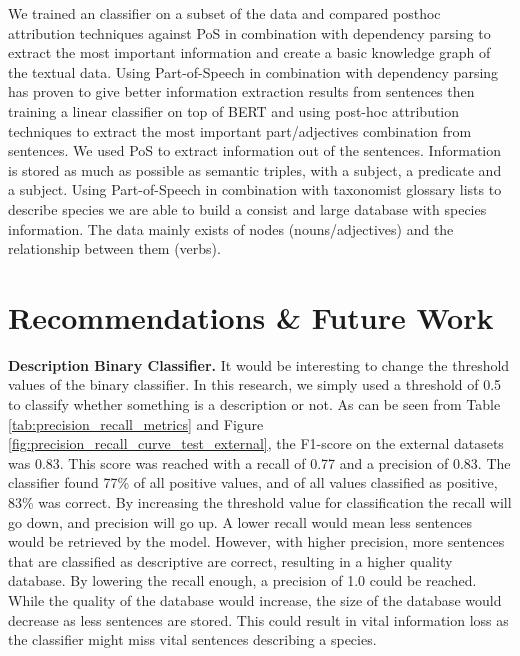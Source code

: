 \documentclass[a4paper, 12pt, oneside]{book} %
\begin{document}
We trained an classifier on a subset of the data and compared posthoc attribution techniques against PoS in combination with dependency parsing to extract the most important information and create a basic knowledge graph of the textual data.
Using Part-of-Speech in combination with dependency parsing has proven to give better information extraction results from sentences then training a linear classifier on top of BERT and using post-hoc attribution techniques to extract the most important part/adjectives combination from sentences.
We used PoS to extract information out of the sentences.
Information is stored as much as possible as semantic triples, with a subject, a predicate and a subject.
Using Part-of-Speech in combination with taxonomist glossary lists to describe species we are able to build a consist and large database with species information.
The data mainly exists of nodes (nouns/adjectives) and the relationship between them (verbs).


\newpage
\section{Recommendations \& Future Work} \label{par:future}
\textbf{Description Binary Classifier.}
It would be interesting to change the threshold values of the binary classifier.
In this research, we simply used a threshold of 0.5 to classify whether something is a description or not.
As can be seen from Table \ref{tab:precision_recall_metrics} and Figure \ref{fig:precision_recall_curve_test_external}, the F1-score on the external datasets was 0.83. 
This score was reached with a recall of 0.77 and a precision of 0.83.
The classifier found 77\% of all positive values, and of all values classified as positive, 83\% was correct.
By increasing the threshold value for classification the recall will go down, and precision will go up.
A lower recall would mean less sentences would be retrieved by the model.
However, with higher precision, more sentences that are classified as descriptive are correct, resulting in a higher quality database.
By lowering the recall enough, a precision of 1.0 could be reached.
While the quality of the database would increase, the size of the database would decrease as less sentences are stored.
This could result in vital information loss as the classifier might miss vital sentences describing a species.
\end{document}
